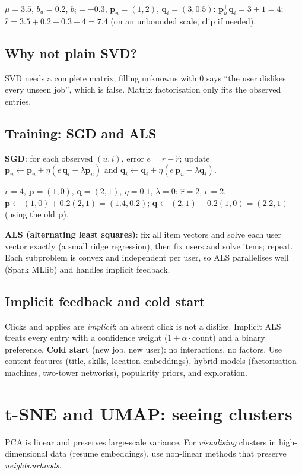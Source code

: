 \begin{example}
$\mu = 3.5$, $b_u = 0.2$, $b_i = -0.3$, $\mathbf p_u = (1, 2)$, $\mathbf q_i = (3, 0.5)$: $\mathbf p_u^\top\mathbf q_i = 3 + 1 = 4$; $\hat r = 3.5 + 0.2 - 0.3 + 4 = 7.4$
(on an unbounded scale; clip if needed).
\end{example}

\subsection{Why not plain SVD?}
SVD needs a complete matrix; filling unknowns with 0 says ``the user dislikes every unseen job'', which is false. Matrix factorisation only fits
the observed entries.

\subsection{Training: SGD and ALS}
\textbf{SGD}: for each observed $(u,i)$, error $e = r - \hat r$; update $\mathbf p_u\leftarrow\mathbf p_u + \eta(e\,\mathbf q_i - \lambda\mathbf p_u)$ and
$\mathbf q_i\leftarrow\mathbf q_i + \eta(e\,\mathbf p_u - \lambda\mathbf q_i)$.
\begin{example}
$r = 4$, $\mathbf p = (1,0)$, $\mathbf q = (2,1)$, $\eta = 0.1$, $\lambda = 0$: $\hat r = 2$, $e = 2$. $\mathbf p\leftarrow(1,0) + 0.2(2,1) = (1.4, 0.2)$;
$\mathbf q\leftarrow(2,1) + 0.2(1,0) = (2.2, 1)$ (using the old $\mathbf p$).
\end{example}
\textbf{ALS (alternating least squares)}: fix all item vectors and solve each user vector exactly (a small ridge regression), then fix users and
solve items; repeat. Each subproblem is convex and independent per user, so ALS parallelises well (Spark MLlib) and handles implicit feedback.

\subsection{Implicit feedback and cold start}
Clicks and applies are \emph{implicit}: an absent click is not a dislike. Implicit ALS treats every entry with a confidence weight
($1 + \alpha\cdot\text{count}$) and a binary preference. \textbf{Cold start} (new job, new user): no interactions, no factors. Use content
features (title, skills, location embeddings), hybrid models (factorisation machines, two-tower networks), popularity priors, and exploration.

\section{t-SNE and UMAP: seeing clusters}
PCA is linear and preserves large-scale variance. For \emph{visualising} clusters in high-dimensional data (resume embeddings), use
non-linear methods that preserve \emph{neighbourhoods}.


